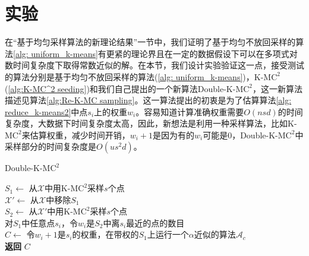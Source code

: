 \section{实验}
在“基于均匀采样算法的新理论结果”一节中，我们证明了基于均匀不放回采样的算法\ref{alg: uniform_k-means}有更紧的理论界且在一定的数据假设下可以在多项式对数时间复杂度下取得常数近似的解。在本节，我们设计实验验证这一点，接受测试的算法分别是基于均匀不放回采样的算法(\ref{alg: uniform_k-means})，K-M$\text{C}^2$(\ref{alg:K-MC^2 seeding})和我们自己提出的一个新算法Double-K-M$\text{C}^2$，这一新算法描述见算法\ref{alg:Re-K-MC sampling}。这一算法提出的初衷是为了估算算法\ref{alg: reduce_k-means2}中点$s_i$上的权重$w_i$。容易知道计算准确权重需要$O(nsd)$的时间复杂度，大数据下时间复杂度太高，因此，新想法是利用一种采样算法，比如K-M$\text{C}^2$来估算权重，减少时间开销，$w_i + 1$是因为有的$w_i$可能是0，Double-K-M$\text{C}^2$中采样部分的时间复杂度是$O(us^2 d)$。
\begin{algorithm}
    \caption{Double-K-M$\text{C}^2$}\label{alg:Re-K-MC sampling}
    $S_1 \gets$ 从$\mathcal{X}$中用K-M$\text{C}^2$采样$s$个点 \\
    $\mathcal{X}' \gets $ 从$\mathcal{X}$中移除$S_1$ \\
    $S_2 \gets$ 从$\mathcal{X}'$中用K-M$\text{C}^2$采样$s$个点 \\
    对$S_1$中任意点$s_i$，令$w_i$是$S_2$中离$s_i$最近的点的数目 \\
    $C \gets$ 令$w_i + 1$是$s_i$的权重，在带权的$S_1$上运行一个$\alpha$近似的算法$\mathcal{A}_c$ \\
    \textbf{返回} $C$
\end{algorithm}